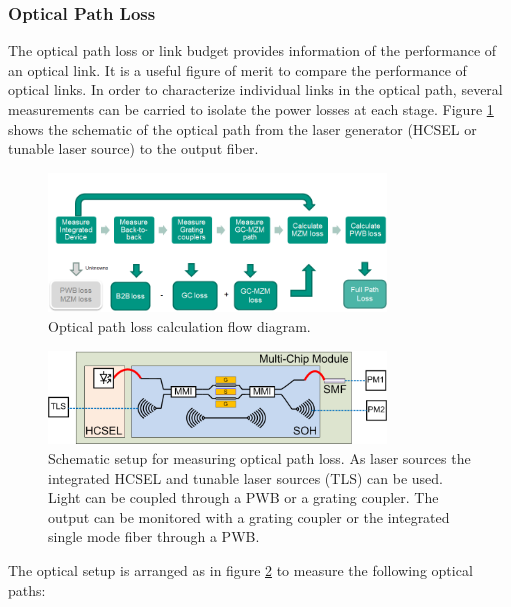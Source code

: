 \subsubsection{Optical Path Loss}
  \label{sub:OPL}

The optical path loss or link budget provides information of the performance of an optical link. It is a useful figure of merit to compare the performance of optical links. In order to characterize individual links in the optical path, several measurements can be carried to isolate the power losses at each stage. Figure \ref{fig:OPL-flow} shows the schematic of the optical path from the laser generator (HCSEL or tunable laser source) to the output fiber.

\begin{figure}[!ht]
\centering
  \includegraphics[width=0.8\textwidth]{visio/OPL-flow}
  \caption{Optical path loss calculation flow diagram.}
  \label{fig:OPL-flow}
\end{figure}

\begin{figure}[!ht]
\centering
  \includegraphics[width=0.8\textwidth]{visio/MCM-LO}
  \caption{Schematic setup for measuring optical path loss. As laser sources the integrated HCSEL and tunable laser sources (TLS) can be used. Light can be coupled through a PWB or a grating coupler. The output can be monitored with a grating coupler or the integrated single mode fiber through a PWB.}
  \label{fig:mcm-LO}
\end{figure}

The optical setup is arranged as in figure \ref{fig:mcm-LO} to measure the following optical paths:


